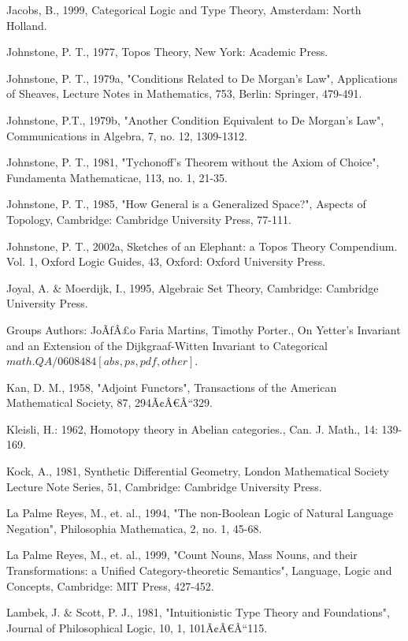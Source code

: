 \documentclass[12pt]{article}
\begin{document}
\begin{thebibliography}{199}
Jacobs, B., 1999, Categorical Logic and Type Theory, Amsterdam: North Holland.  

Johnstone, P. T., 1977, Topos Theory, New York: Academic Press. 

Johnstone, P. T., 1979a, "Conditions Related to De Morgan's Law", Applications of Sheaves, Lecture Notes in Mathematics, 753, Berlin: Springer, 479-491. 

Johnstone, P.T., 1979b, "Another Condition Equivalent to De Morgan's Law", Communications in Algebra, 7, no. 12, 
1309-1312.  

Johnstone, P. T., 1981, "Tychonoff's Theorem without the Axiom of Choice", Fundamenta Mathematicae, 113, no. 1,
21-35. 

Johnstone, P. T., 1985, "How General is a Generalized Space?", Aspects of Topology, Cambridge: Cambridge University Press, 77-111. 

Johnstone, P. T., 2002a, Sketches of an Elephant: a Topos Theory Compendium. Vol. 1, Oxford Logic Guides, 43, Oxford: Oxford University Press.  

Joyal, A. \& Moerdijk, I., 1995, Algebraic Set Theory, Cambridge: Cambridge University Press.  

Groups Authors: JoÃƒÂ£o Faria Martins, Timothy Porter.,
On Yetter's Invariant and an Extension of the Dijkgraaf-Witten Invariant to Categorical
$math.QA/0608484 [abs, ps, pdf, other]$.

Kan, D. M., 1958, "Adjoint Functors", Transactions of the American Mathematical Society, 87, 294Ã¢Â€Â“329.  

Kleisli, H.: 1962, Homotopy theory in Abelian categories., Can. J. Math., 14: 139-169.

Kock, A., 1981, Synthetic Differential Geometry, London Mathematical Society Lecture Note Series, 51, Cambridge: Cambridge University Press. 

La Palme Reyes, M., et. al., 1994, "The non-Boolean Logic of Natural Language Negation", Philosophia Mathematica, 2, no. 1, 45-68.

La Palme Reyes, M., et. al., 1999, "Count Nouns, Mass Nouns, and their Transformations: a Unified Category-theoretic Semantics", Language, Logic and Concepts, Cambridge: MIT Press, 427-452.  

Lambek, J. \& Scott, P. J., 1981, "Intuitionistic Type Theory and Foundations", Journal of Philosophical Logic, 10, 1, 101Ã¢Â€Â“115. 


\end{thebibliography}
\end{document}
